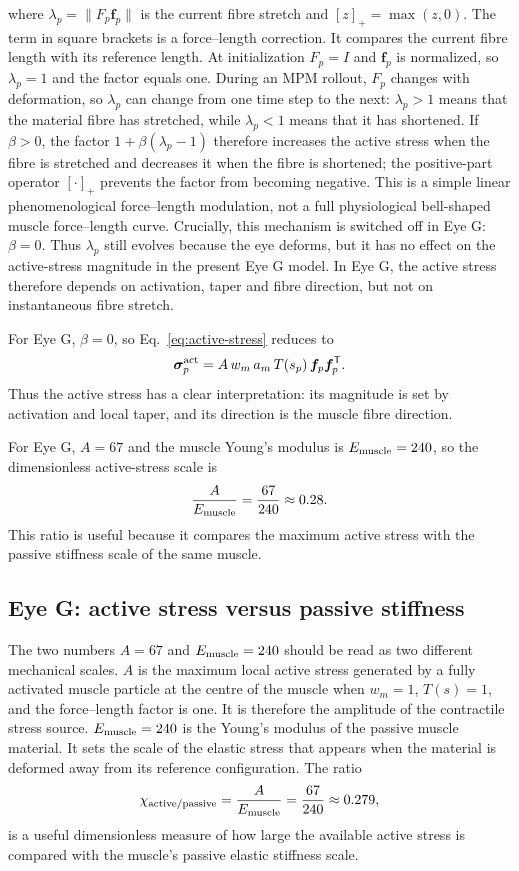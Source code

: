 \documentclass[11pt]{article}
\newcommand{\vect}[1]{\bm{#1}}
\newcommand{\sig}{\boldsymbol{\sigma}}
\begin{document}
where $\lambda_p=\|F_p\vect f_p\|$ is the current fibre stretch and $[z]_+=\max(z,0)$. The term in square brackets is a force--length correction. It compares the current fibre length with its reference length. At initialization $F_p=I$ and $\vect f_p$ is normalized, so $\lambda_p=1$ and the factor equals one. During an MPM rollout, $F_p$ changes with deformation, so $\lambda_p$ can change from one time step to the next: $\lambda_p>1$ means that the material fibre has stretched, while $\lambda_p<1$ means that it has shortened. If $\beta>0$, the factor $1+\beta(\lambda_p-1)$ therefore increases the active stress when the fibre is stretched and decreases it when the fibre is shortened; the positive-part operator $[\cdot]_+$ prevents the factor from becoming negative. This is a simple linear phenomenological force--length modulation, not a full physiological bell-shaped muscle force--length curve. Crucially, this mechanism is switched off in Eye G: $\beta=0$. Thus $\lambda_p$ still evolves because the eye deforms, but it has no effect on the active-stress magnitude in the present Eye G model. In Eye G, the active stress therefore depends on activation, taper and fibre direction, but not on instantaneous fibre stretch.

For Eye G, $\beta=0$, so Eq.~\eqref{eq:active-stress} reduces to
\begin{equation}
\sig^{\rm act}_p
=
A\,w_m\,a_m\,T(s_p)\,
\vect f_p\vect f_p^{\mathsf T}.
\label{eq:active-stress-eyeG}
\end{equation}
Thus the active stress has a clear interpretation: its magnitude is set by activation and local taper, and its direction is the muscle fibre direction.

For Eye G, $A=67$ and the muscle Young's modulus is $E_{\rm muscle}=240$, so the dimensionless active-stress scale is
\begin{equation}
\frac{A}{E_{\rm muscle}}=\frac{67}{240}\approx0.28.
\label{eq:auto9}
\end{equation}
This ratio is useful because it compares the maximum active stress with the passive stiffness scale of the same muscle.

\subsection*{Eye G: active stress versus passive stiffness}
The two numbers $A=67$ and $E_{\rm muscle}=240$ should be read as two different mechanical scales. $A$ is the maximum local active stress generated by a fully activated muscle particle at the centre of the muscle when $w_m=1$, $T(s)=1$, and the force--length factor is one. It is therefore the amplitude of the contractile stress source. $E_{\rm muscle}=240$ is the Young's modulus of the passive muscle material. It sets the scale of the elastic stress that appears when the material is deformed away from its reference configuration. The ratio
\begin{equation}
\chi_{\rm active/passive}=\frac{A}{E_{\rm muscle}}=\frac{67}{240}\approx0.279,
\label{eq:active-passive-ratio}
\end{equation}
is a useful dimensionless measure of how large the available active stress is compared with the muscle's passive elastic stiffness scale.
\end{document}
